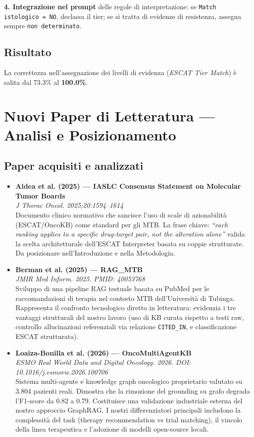 \documentclass[12pt, a4paper]{article}
\newcommand{\pass}[1]{{\color{passgreen}\textbf{#1}}}
\begin{document}
\textbf{4. Integrazione nel prompt} delle regole di interpretazione: se \texttt{Match istologico = NO}, declassa il tier; se si tratta di evidenze di resistenza, assegna sempre \texttt{non determinato}.

\subsection{Risultato}
La correttezza nell'assegnazione dei livelli di evidenza (\textit{ESCAT Tier Match}) è salita dal 73.3\% al \pass{100.0\%}.

\section{Nuovi Paper di Letteratura --- Analisi e Posizionamento}

\subsection{Paper acquisiti e analizzati}
\begin{itemize}[leftmargin=1.5em, itemsep=4pt]
  \item \textbf{Aldea et al. (2025) --- IASLC Consensus Statement on Molecular Tumor Boards}\\
  \textit{J Thorac Oncol. 2025;20:1594--1614}\\
  Documento clinico normativo che sancisce l'uso di scale di azionabilità (ESCAT/OncoKB) come standard per gli MTB. La frase chiave: \textit{``each ranking applies to a specific drug-target pair, not the alteration alone''} valida la scelta architetturale dell'ESCAT Interpreter basata su coppie strutturate. Da posizionare nell'Introduzione e nella Metodologia.
  
  \item \textbf{Berman et al. (2025) --- RAG\_MTB}\\
  \textit{JMIR Med Inform. 2025. PMID: 40053768}\\
  Sviluppo di una pipeline RAG testuale basata su PubMed per le raccomandazioni di terapia nel contesto MTB dell'Università di Tubinga. Rappresenta il confronto tecnologico diretto in letteratura: evidenzia i tre vantaggi strutturali del nostro lavoro (uso di KB curata rispetto a testi raw, controllo allucinazioni referenziali via relazione \texttt{CITED\_IN}, e classificazione ESCAT strutturata).
  
  \item \textbf{Loaiza-Bonilla et al. (2026) --- OncoMultiAgentKB}\\
  \textit{ESMO Real World Data and Digital Oncology. 2026. DOI: 10.1016/j.esmorw.2026.100706}\\
  Sistema multi-agente e knowledge graph oncologico proprietario valutato su 3.804 pazienti reali. Dimostra che la rimozione del grounding su grafo degrada l'F1-score da 0.82 a 0.79. Costituisce una validazione industriale esterna del nostro approccio GraphRAG. I nostri differenziatori principali includono la complessità del task (therapy recommendation vs trial matching), il vincolo della linea terapeutica e l'adozione di modelli open-source locali.
\end{itemize}
\end{document}
